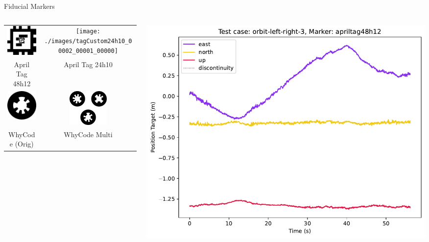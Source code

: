 \documentclass[aspectratio=169]{beamer}
\begin{document}
\begin{frame}{Fiducial Markers}
\begin{columns}
\begin{column}{0.5\textwidth}
	\centering
	\begin{tabular}{cc}
		\includegraphics[width=2cm]{./images/tagCustom48h12_00002_00001_00000}
		&
		\texttt{[image: ./images/tagCustom24h10\_00002\_00001\_00000]}
		\\
		April Tag 48h12%
		&
		April Tag 24h10%
		\\
		\includegraphics[width=2cm]{./images/whycode_20_8}
		&
		\includegraphics[width=2cm]{./images/whycode_multi}
		\\
		WhyCode (Orig)%
		&
		WhyCode Multi%
	\end{tabular}
\end{column}
\begin{column}{0.5\textwidth}
	\centering
	\includegraphics[width=\linewidth]{images/orbit-left-right-3_apriltag48h12_position-target}
\end{column}
\end{columns}
\end{frame}
\end{document}
